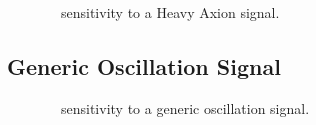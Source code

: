 			\begin{figure}
				\centering
				\caption{\MJ~\minmod~sensitivity to a Heavy Axion signal.}
				\label{fig:MJSensitivityToHeavyAxions}
			\end{figure}		
		\subsection{Generic Oscillation Signal}
		\label{sec:MJSensitivityToGenOsc}
		
			\begin{figure}
				\centering
				\caption{\MJ~\minmod~sensitivity to a generic oscillation signal.}
				\label{fig:MJSensitivityToGenOscSignal}
			\end{figure}		
	

